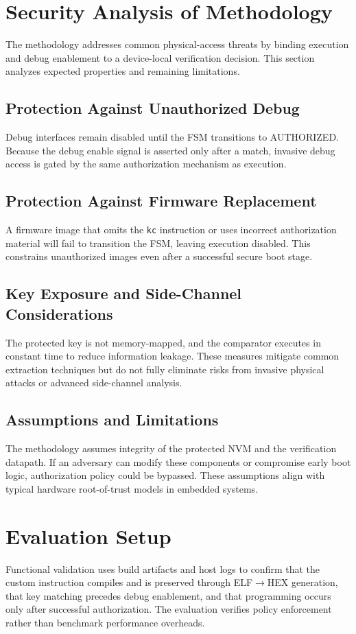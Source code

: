 \section{Security Analysis of Methodology}
The methodology addresses common physical-access threats by binding execution and debug
enablement to a device-local verification decision. This section analyzes expected
properties and remaining limitations.

\subsection{Protection Against Unauthorized Debug}
Debug interfaces remain disabled until the FSM transitions to \textsf{AUTHORIZED}. Because
the debug enable signal is asserted only after a match, invasive debug access is gated by
the same authorization mechanism as execution.

\subsection{Protection Against Firmware Replacement}
A firmware image that omits the \texttt{kc} instruction or uses incorrect authorization
material will fail to transition the FSM, leaving execution disabled. This constrains
unauthorized images even after a successful secure boot stage.

\subsection{Key Exposure and Side-Channel Considerations}
The protected key is not memory-mapped, and the comparator executes in constant time to
reduce information leakage. These measures mitigate common extraction techniques but do not
fully eliminate risks from invasive physical attacks or advanced side-channel analysis.

\subsection{Assumptions and Limitations}
The methodology assumes integrity of the protected NVM and the verification datapath. If an
adversary can modify these components or compromise early boot logic, authorization policy
could be bypassed. These assumptions align with typical hardware root-of-trust models in
embedded systems.

\section{Evaluation Setup}
Functional validation uses build artifacts and host logs to confirm that the custom
instruction compiles and is preserved through ELF$\rightarrow$HEX generation, that key
matching precedes debug enablement, and that programming occurs only after successful
authorization. The evaluation verifies policy enforcement rather than benchmark
performance overheads.

